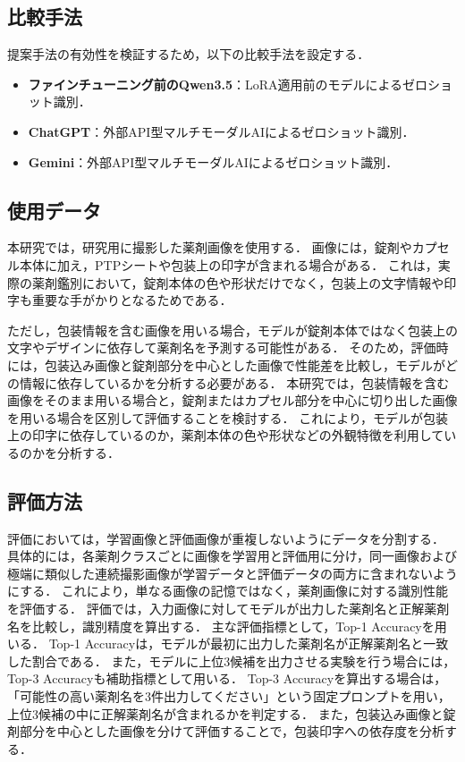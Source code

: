 \documentclass{ltjsarticle}
\begin{document}
\subsection{比較手法}

提案手法の有効性を検証するため，以下の比較手法を設定する．

\begin{itemize}
  \item \textbf{ファインチューニング前のQwen3.5}：LoRA適用前のモデルによるゼロショット識別．
  \item \textbf{ChatGPT}：外部API型マルチモーダルAIによるゼロショット識別．
  \item \textbf{Gemini}：外部API型マルチモーダルAIによるゼロショット識別．
\end{itemize}

\subsection{使用データ}

本研究では，研究用に撮影した薬剤画像を使用する．
画像には，錠剤やカプセル本体に加え，PTPシートや包装上の印字が含まれる場合がある．
これは，実際の薬剤鑑別において，錠剤本体の色や形状だけでなく，包装上の文字情報や印字も重要な手がかりとなるためである．

ただし，包装情報を含む画像を用いる場合，モデルが錠剤本体ではなく包装上の文字やデザインに依存して薬剤名を予測する可能性がある．
そのため，評価時には，包装込み画像と錠剤部分を中心とした画像で性能差を比較し，モデルがどの情報に依存しているかを分析する必要がある．
本研究では，包装情報を含む画像をそのまま用いる場合と，錠剤またはカプセル部分を中心に切り出した画像を用いる場合を区別して評価することを検討する．
これにより，モデルが包装上の印字に依存しているのか，薬剤本体の色や形状などの外観特徴を利用しているのかを分析する．

\subsection{評価方法}

評価においては，学習画像と評価画像が重複しないようにデータを分割する．
具体的には，各薬剤クラスごとに画像を学習用と評価用に分け，同一画像および極端に類似した連続撮影画像が学習データと評価データの両方に含まれないようにする．
これにより，単なる画像の記憶ではなく，薬剤画像に対する識別性能を評価する．
評価では，入力画像に対してモデルが出力した薬剤名と正解薬剤名を比較し，識別精度を算出する．
主な評価指標として，Top-1 Accuracyを用いる．
Top-1 Accuracyは，モデルが最初に出力した薬剤名が正解薬剤名と一致した割合である．
また，モデルに上位3候補を出力させる実験を行う場合には，Top-3 Accuracyも補助指標として用いる．
Top-3 Accuracyを算出する場合は，「可能性の高い薬剤名を3件出力してください」という固定プロンプトを用い，上位3候補の中に正解薬剤名が含まれるかを判定する．
また，包装込み画像と錠剤部分を中心とした画像を分けて評価することで，包装印字への依存度を分析する．
\end{document}
